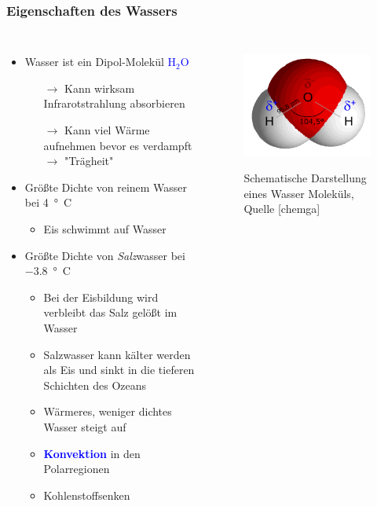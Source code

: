\begin{frame}
	\frametitle{Eigenschaften des Wassers} %
	\begin{columns}
		\begin{itemize}
			\item Wasser ist ein Dipol-Molekül \textcolor{blue}{H$_2$O}
			\begin{itemize}
				\item[$\rightarrow$] Kann wirksam Infrarotstrahlung absorbieren
				\item[$\rightarrow$] Kann viel Wärme aufnehmen bevor es verdampft $\rightarrow$ "Trägheit"
			\end{itemize}
			\item<2-> Größte Dichte von reinem Wasser bei \SI{4}{°C}
			\begin{itemize}
				\item<2->[$\rightarrow$] Eis schwimmt auf Wasser
			\end{itemize}
			\item<3->Größte Dichte von \textit{Salz}wasser bei \SI{-3,8}{°C}
			\begin{itemize}
				\item<3-> [] Bei der Eisbildung wird verbleibt das Salz gelößt im Wasser
				\item<3-> [$\rightarrow$] Salzwasser kann kälter werden als Eis und sinkt in die tieferen Schichten des Ozeans
				\item<3-> [$\rightarrow$] Wärmeres, weniger dichtes Wasser steigt auf
				\item<3-> [] \textbf{\textcolor{blue}{Konvektion}} in den Polarregionen
				\item<3-> [$\rightarrow$] Kohlenstoffsenken
			\end{itemize}
		\end{itemize}
		\begin{figure}
			\includegraphics[scale=0.7]{bilder/wasser_molekuel}\\		\caption{Schematische Darstellung eines Wasser Moleküls, Quelle [chemga]}

\end{figure}
\end{columns}
\end{frame}
